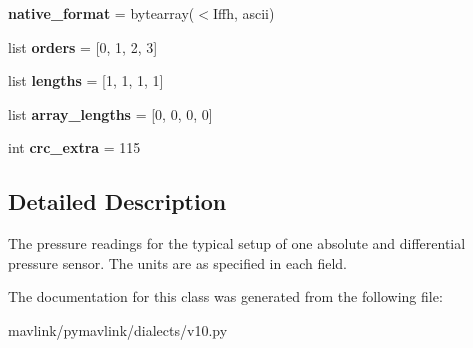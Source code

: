 \begin{DoxyCompactItemize}
{\bfseries native\+\_\+format} = bytearray(\textquotesingle{}$<$Iffh\textquotesingle{}, \textquotesingle{}ascii\textquotesingle{})
\item 
\mbox{\label{classpymavlink_1_1dialects_1_1v10_1_1MAVLink__scaled__pressure__message_a5df40e70628f6435c0500b4ad4182f36}} 
list {\bfseries orders} = \mbox{[}0, 1, 2, 3\mbox{]}
\item 
\mbox{\label{classpymavlink_1_1dialects_1_1v10_1_1MAVLink__scaled__pressure__message_af5b0f90e05e20771c17dd7e7eec343c4}} 
list {\bfseries lengths} = \mbox{[}1, 1, 1, 1\mbox{]}
\item 
\mbox{\label{classpymavlink_1_1dialects_1_1v10_1_1MAVLink__scaled__pressure__message_acc7ad6b0639d6458e0d76818e6e8ec6c}} 
list {\bfseries array\+\_\+lengths} = \mbox{[}0, 0, 0, 0\mbox{]}
\item 
\mbox{\label{classpymavlink_1_1dialects_1_1v10_1_1MAVLink__scaled__pressure__message_aa9fe7b27fc345d22372d97952385e13e}} 
int {\bfseries crc\+\_\+extra} = 115
\end{DoxyCompactItemize}


\subsection{Detailed Description}
\begin{DoxyVerb}The pressure readings for the typical setup of one absolute
and differential pressure sensor. The units are as specified
in each field.
\end{DoxyVerb}
 

The documentation for this class was generated from the following file\+:\begin{DoxyCompactItemize}
\item 
mavlink/pymavlink/dialects/v10.\+py\end{DoxyCompactItemize}
